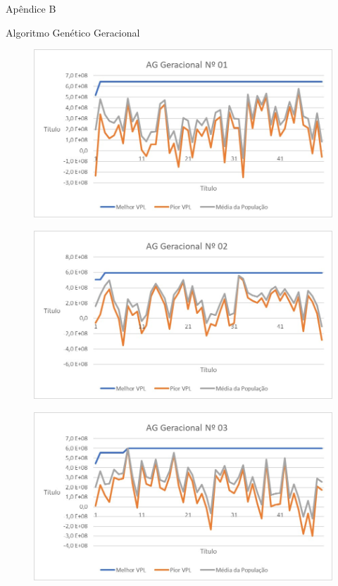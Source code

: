 \documentclass[12pt,a4paper]{report}
\begin{document}
Apêndice B

Algoritmo Genético Geracional

\begin{figure}[H]
\centering

\includegraphics[scale=1]{AGG/1}

\end{figure}

\begin{figure}[H]
\centering

\includegraphics[scale=1]{AGG/2}

\end{figure}

\begin{figure}[H]
\centering

\includegraphics[scale=1]{AGG/3}

\end{figure}
\end{document}
